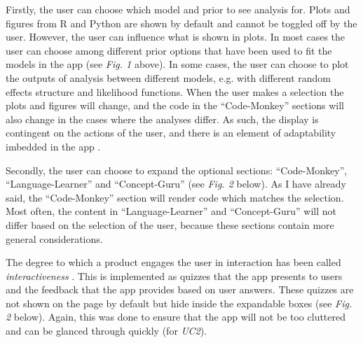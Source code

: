 \documentclass[12pt]{article}
\begin{document}
\vspace{5mm}

Firstly, the user can choose which model and prior to see analysis for.
Plots and figures from R and Python are shown by default and cannot be toggled off by the user.
However, the user can influence what is shown in plots. In most cases the user can choose
among different prior options that have been used to fit the models in the app
(see \emph{Fig. 1} above).
In some cases, the user can choose to plot the outputs of analysis between different models,
e.g. with different random effects structure and likelihood functions.
When the user makes a selection the plots and figures will change,
and the code in the “Code-Monkey” sections will also change in the cases where the analyses differ.
As such, the display is contingent on the actions of the user,
and there is an element of adaptability imbedded in the
app \autocite{janlert2017meaning}.


\vspace{5mm}

Secondly, the user can choose to expand the optional sections:
“Code-Monkey”, “Language-Learner” and “Concept-Guru” (see \emph{Fig. 2} below).
As I have already said, the “Code-Monkey” section will render code which matches the selection.
Most often, the content in “Language-Learner” and “Concept-Guru” will not differ
based on the selection of the user, because these sections contain more general considerations.

\vspace{5mm}

The degree to which a
product engages the user in interaction has been called \emph{interactiveness}
\autocite{janlert2017meaning}. This is implemented as quizzes that the app
presents to users and the feedback that the app provides based on user answers.
These quizzes are not shown on the page by default but hide inside the
expandable boxes (see \emph{Fig. 2} below).
Again, this was done to ensure that the app will not be too cluttered and can be glanced
through quickly (for \emph{UC2}).

\vspace{5mm}
\end{document}

